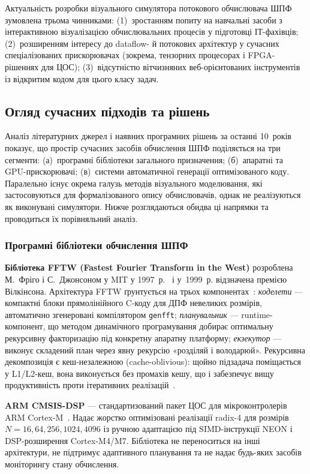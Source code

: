 Актуальність розробки візуального симулятора потокового обчислювача
ШПФ зумовлена трьома чинниками: (1)~зростанням попиту на навчальні
засоби з інтерактивною візуалізацією обчислювальних процесів у
підготовці ІТ-фахівців; (2)~розширенням інтересу до dataflow- й
потокових архітектур у сучасних спеціалізованих прискорювачах
(зокрема, тензорних процесорах і FPGA-рішеннях для ЦОС);
(3)~відсутністю вітчизняних веб-орієнтованих інструментів із
відкритим кодом для цього класу задач.


\subsection{Огляд сучасних підходів та рішень}

Аналіз літературних джерел і наявних програмних рішень за останні
10~років показує, що простір сучасних засобів обчислення ШПФ
поділяється на три сегменти: (а)~програмні бібліотеки загального
призначення; (б)~апаратні та GPU-прискорювачі; (в)~системи
автоматичної генерації оптимізованого коду. Паралельно існує
окрема галузь методів візуального моделювання, які застосовуються
для формалізованого опису обчислювачів, однак не реалізуються як
виконувані симулятори. Нижче розглядаються обидва ці напрямки та
проводиться їх порівняльний аналіз.

\subsubsection*{Програмні бібліотеки обчислення ШПФ}

\textbf{Бібліотека FFTW (Fastest Fourier Transform in the West)}
розроблена М.~Фріго і С.~Джонсоном у MIT у 1997~р.~\cite{frigo1998}
і у~1999~р. відзначена премією Вілкінсона. Архітектура FFTW
ґрунтується на трьох компонентах~\cite{frigo2005}: \emph{коделети}
--- компактні блоки прямолінійного C-коду для ДПФ невеликих розмірів,
автоматично згенеровані компілятором \texttt{genfft}; \emph{планувальник}
--- runtime-компонент, що методом динамічного програмування добирає
оптимальну рекурсивну факторизацію під конкретну апаратну платформу;
\emph{екзекутор} --- виконує складений план через явну рекурсію
«розділяй і володарюй». Рекурсивна декомпозиція є кеш-незалежною
(cache-oblivious): щойно підзадача поміщається у L1/L2-кеш, вона
виконується без промахів кешу, що і забезпечує вищу продуктивність
проти ітеративних реалізацій~\cite{frigo2005}.

\textbf{ARM CMSIS-DSP} --- стандартизований пакет ЦОС для
мікроконтролерів ARM Cortex-M~\cite{cmsis_dsp}. Надає жорстко
оптимізовані реалізації radix-4 для розмірів $N = 16, 64, 256,
1024, 4096$ із ручною адаптацією під SIMD-інструкції NEON і
DSP-розширення Cortex-M4/M7. Бібліотека не переноситься на інші
архітектури, не підтримує адаптивного планування та не надає
будь-яких засобів моніторингу стану обчислення.


